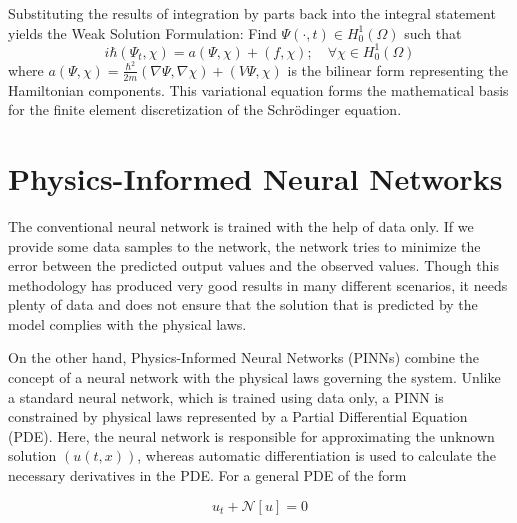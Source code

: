 \documentclass[11pt]{article}
\begin{document}
Substituting the results of integration by parts back into the integral statement yields the Weak Solution Formulation:
Find $\Psi (\cdot, t) \in H_0^1(\Omega)$ such that
\begin{equation}
		i \hbar(\Psi_t,\chi) = a(\Psi, \chi) + (f, \chi) ; \quad \forall \chi \in H_0^1(\Omega)
\end{equation}
where $ a(\Psi,\chi) = \frac{\hbar^2}{2m} (\nabla \Psi,\nabla \chi) + (V\Psi,\chi)$ is the bilinear form representing the Hamiltonian components. This variational equation forms the mathematical basis for the finite element discretization of the Schrödinger equation.
























\section{Physics-Informed Neural Networks}


The conventional neural network is trained with the help of data only. If we provide some data samples to 
the network, the network tries to minimize the error between the predicted output values and the observed
values. Though this methodology has produced very good results in many different scenarios, it needs plenty 
of data and does not ensure that the solution that is predicted by the model complies with the physical laws.

On the other hand, Physics-Informed Neural Networks (PINNs) combine the concept of a neural network with the 
physical laws governing the system. Unlike a standard neural network, which is trained using data only, 
a PINN is constrained by physical laws represented by a Partial Differential Equation (PDE). 
Here, the neural network is responsible for approximating the unknown solution $(u(t,x))$, whereas automatic
differentiation is used to calculate the necessary derivatives in the PDE.
For a general PDE of the form

\begin{equation}
	u_t + \mathcal{N}[u] = 0
\end{equation}
\end{document}
